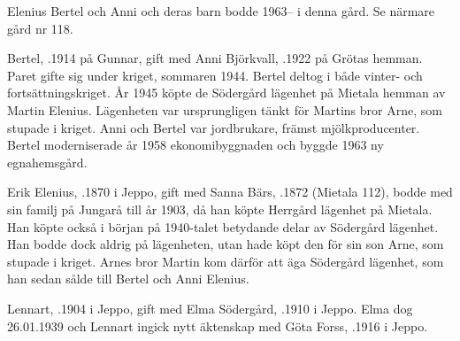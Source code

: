 %
Elenius Bertel och Anni och deras barn bodde 1963-- i denna gård. Se närmare gård nr 118.\jhvspace{}



%


%
Bertel, .1914 på Gunnar, gift med Anni Björkvall, .1922 på Grötas hemman. Paret gifte sig under kriget, sommaren 1944. Bertel deltog i både vinter- och fortsättningskriget. År 1945 köpte de Södergård lägenhet på Mietala hemman av Martin Elenius. Lägenheten var ursprungligen tänkt för Martins bror Arne, som stupade i kriget. Anni och Bertel var jordbrukare, främst mjölkproducenter. Bertel moderniserade år 1958 ekonomibyggnaden och byggde 1963 ny egnahemsgård.
\begin{jhchildren}
  \item {}
  \item {}
\end{jhchildren}



%
Erik Elenius, .1870 i Jeppo, gift med Sanna Bärs, .1872 (Mietala 112), bodde med sin familj på Jungarå till år 1903, då han köpte Herrgård lägenhet på Mietala. Han köpte också i början på 1940-talet betydande delar av Södergård lägenhet. Han bodde dock aldrig på lägenheten, utan hade köpt den för sin son Arne, som stupade i kriget. Arnes bror Martin kom därför att äga Södergård lägenhet, som han sedan sålde till Bertel och Anni Elenius.


%
Lennart, .1904 i Jeppo, gift med Elma Södergård, .1910 i Jeppo. Elma dog 26.01.1939 och Lennart ingick nytt äktenskap med Göta Forss, .1916  i Jeppo.
\begin{jhchildren}
  \item {}
  \item {}
  \item {}
  \item {}
\end{jhchildren}

